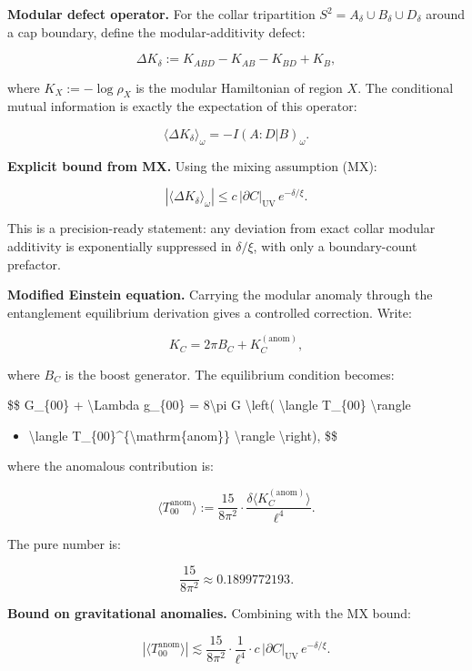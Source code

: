 \textbf{Modular defect operator.} For the collar tripartition \(S^2 = A_\delta \cup
B_\delta \cup D_\delta\) around a cap boundary, define the modular-additivity defect:

\[
\Delta K_\delta := K_{ABD} - K_{AB} - K_{BD} + K_B,
\]

where \(K_X := -\log \rho_X\) is the modular Hamiltonian of region \(X\). The conditional mutual information is exactly the expectation of this operator:

\[
\langle \Delta K_\delta \rangle_\omega = -I(A:D|B)_\omega.
\]

\textbf{Explicit bound from MX.} Using the mixing assumption (MX):

\[
\left| \langle \Delta K_\delta \rangle_\omega \right|
\le c \, |\partial C|_{\mathrm{UV}} \, e^{-\delta/\xi}.
\]

This is a precision-ready statement: any deviation from exact collar modular additivity is exponentially suppressed in \(\delta/\xi\), with only a boundary-count prefactor.

\textbf{Modified Einstein equation.} Carrying the modular anomaly through the entanglement equilibrium derivation gives a controlled correction. Write:

\[
K_C = 2\pi B_C + K_C^{\mathrm{(anom)}},
\]

where \(B_C\) is the boost generator. The equilibrium condition becomes:

\$\$ G\_\{00\} + \textbackslash Lambda g\_\{00\} = 8\textbackslash pi G \textbackslash left( \textbackslash langle T\_\{00\} \textbackslash rangle

\begin{itemize}
\tightlist
\item
  \textbackslash langle T\_\{00\}\^{}\{\textbackslash mathrm\{anom\}\} \textbackslash rangle \textbackslash right), \$\$
\end{itemize}

where the anomalous contribution is:

\[
\langle T_{00}^{\mathrm{anom}} \rangle
:= \frac{15}{8\pi^2} \cdot \frac{\delta \langle K_C^{\mathrm{(anom)}} \rangle}{\ell^4}.
\]

The pure number is:

\[
\frac{15}{8\pi^2} \approx 0.1899772193.
\]

\textbf{Bound on gravitational anomalies.} Combining with the MX bound:

\[
\left| \langle T_{00}^{\mathrm{anom}} \rangle \right|
\lesssim \frac{15}{8\pi^2} \cdot \frac{1}{\ell^4} \cdot
c \, |\partial C|_{\mathrm{UV}} \, e^{-\delta/\xi}.
\]

